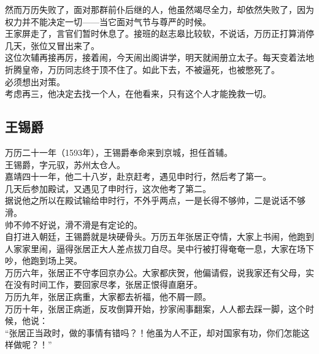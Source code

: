 \begin{multicols}{\theparacolNo}
然而万历失败了，面对那群前仆后继的人，他虽然竭尽全力，却依然失败了，因为权力并不能决定一切——当它面对气节与尊严的时候。\\

王家屏走了，言官们暂时休息了。接班的赵志皋比较软，不说话，万历正打算消停几天，张位又冒出来了。\\

这位次辅再接再厉，接着闹，今天闹出阁讲学，明天就闹册立太子。每天变着法地折腾皇帝，万历同志终于顶不住了。如此下去，不被逼死，也被憋死了。\\

必须想出对策。\\

考虑再三，他决定去找一个人，在他看来，只有这个人才能挽救一切。\\

\subsection{王锡爵}
万历二十一年（1593年），王锡爵奉命来到京城，担任首辅。\\

王锡爵，字元驭，苏州太仓人。\\

嘉靖四十一年，他二十八岁，赴京赶考，遇见申时行，然后考了第一。\\

几天后参加殿试，又遇见了申时行，这次他考了第二。\\

据说他之所以在殿试输给申时行，不外乎两点，一是长得不够帅，二是说话不够滑。\\

帅不帅不好说，滑不滑是有定论的。\\

自打进入朝廷，王锡爵就是块硬骨头。万历五年张居正夺情，大家上书闹，他跑到人家家里闹，逼得张居正大人差点拔刀自尽。吴中行被打得奄奄一息，大家在场下吵，他跑到场上哭。\\

万历六年，张居正不守孝回京办公。大家都庆贺，他偏请假，说我家还有父母，实在没有时间工作，要回家尽孝，张居正恨得直磨牙。\\

万历九年，张居正病重，大家都去祈福，他不屑一顾。\\

万历十年，张居正病逝，反攻倒算开始，抄家闹事翻案，人人都去踩一脚，这个时候，他说：\\

“张居正当政时，做的事情有错吗？！他虽为人不正，却对国家有功，你们怎能这样做呢？！”\\


\end{multicols}
